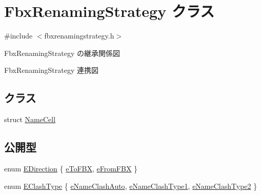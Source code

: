 \hypertarget{class_fbx_renaming_strategy}{}\section{Fbx\+Renaming\+Strategy クラス}
\label{class_fbx_renaming_strategy}


{\ttfamily \#include $<$fbxrenamingstrategy.\+h$>$}



Fbx\+Renaming\+Strategy の継承関係図


Fbx\+Renaming\+Strategy 連携図
\subsection*{クラス}
\begin{DoxyCompactItemize}
\item 
struct \hyperlink{struct_fbx_renaming_strategy_1_1_name_cell}{Name\+Cell}
\end{DoxyCompactItemize}
\subsection*{公開型}
\begin{DoxyCompactItemize}
\item 
enum \hyperlink{class_fbx_renaming_strategy_a68099d97d087f66edd2ea873e0dbf423}{E\+Direction} \{ \hyperlink{class_fbx_renaming_strategy_a68099d97d087f66edd2ea873e0dbf423a5090bf661dd42c70207cef715cbcee56}{e\+To\+F\+BX}, 
\hyperlink{class_fbx_renaming_strategy_a68099d97d087f66edd2ea873e0dbf423aa816a2056da21a8dedcffd502248d854}{e\+From\+F\+BX}
 \}
\item 
enum \hyperlink{class_fbx_renaming_strategy_aacebe214cec13a6cdbbc9e40d16c57dd}{E\+Clash\+Type} \{ \hyperlink{class_fbx_renaming_strategy_aacebe214cec13a6cdbbc9e40d16c57ddabf295c4337c8ee754ddda6386be6b4de}{e\+Name\+Clash\+Auto}, 
\hyperlink{class_fbx_renaming_strategy_aacebe214cec13a6cdbbc9e40d16c57dda692c1d6475ff91b487d8221fe7949495}{e\+Name\+Clash\+Type1}, 
\hyperlink{class_fbx_renaming_strategy_aacebe214cec13a6cdbbc9e40d16c57dda682028d5d582f5d5edf29fdb06a37803}{e\+Name\+Clash\+Type2}
 \}
\end{DoxyCompactItemize}
